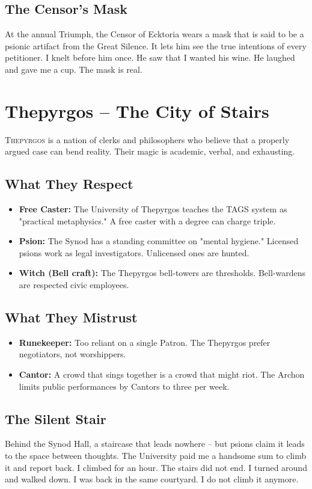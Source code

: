 \documentclass[10pt,a5paper]{book}
\begin{document}
\subsection*{The Censor's Mask}
At the annual Triumph, the Censor of Ecktoria wears a mask that is said to be a psionic artifact from the Great Silence. It lets him see the true intentions of every petitioner. I knelt before him once. He saw that I wanted his wine. He laughed and gave me a cup. The mask is real.

\section{Thepyrgos -- The City of Stairs}

\lettrine{T}{hepyrgos} is a nation of clerks and philosophers who believe that a properly argued case can bend reality. Their magic is academic, verbal, and exhausting.

\subsection*{What They Respect}
\begin{itemize}
    \item \textbf{Free Caster:} The University of Thepyrgos teaches the TAGS system as "practical metaphysics." A free caster with a degree can charge triple.
    \item \textbf{Psion:} The Synod has a standing committee on "mental hygiene." Licensed psions work as legal investigators. Unlicensed ones are hunted.
    \item \textbf{Witch (Bell craft):} The Thepyrgos bell-towers are thresholds. Bell-wardens are respected civic employees.
\end{itemize}

\subsection*{What They Mistrust}
\begin{itemize}
    \item \textbf{Runekeeper:} Too reliant on a single Patron. The Thepyrgos prefer negotiators, not worshippers.
    \item \textbf{Cantor:} A crowd that sings together is a crowd that might riot. The Archon limits public performances by Cantors to three per week.
\end{itemize}

\subsection*{The Silent Stair}
Behind the Synod Hall, a staircase that leads nowhere -- but psions claim it leads to the space between thoughts. The University paid me a handsome sum to climb it and report back. I climbed for an hour. The stairs did not end. I turned around and walked down. I was back in the same courtyard. I do not climb it anymore.
\end{document}
